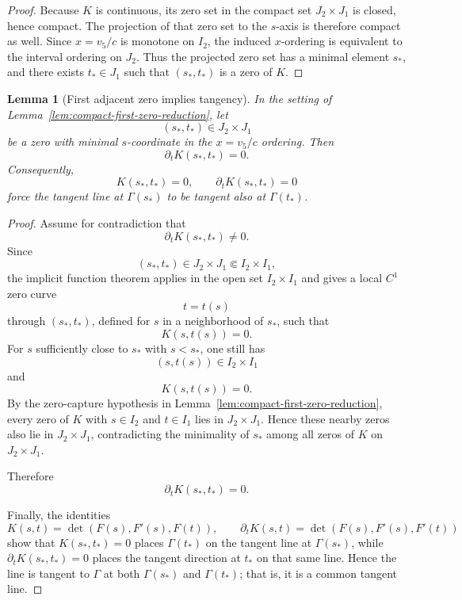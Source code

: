 \documentclass[11pt,a4paper]{amsart}
\theoremstyle{plain}
\newtheorem{lemma}[theorem]{Lemma}
\theoremstyle{definition}
\begin{document}
\begin{proof}
Because $K$ is continuous, its zero set in the compact set $J_2\times J_1$
is closed, hence compact. The projection of that zero set to the $s$-axis is
therefore compact as well. Since $x=v_5/c$ is monotone on $I_2$, the
induced $x$-ordering is equivalent to the interval ordering on $J_2$. Thus
the projected zero set has a minimal element $s_*$, and there exists
$t_*\in J_1$ such that $(s_*,t_*)$ is a zero of $K$.
\end{proof}

\begin{lemma}[First adjacent zero implies tangency]
\label{lem:first-adjacent-zero-implies-tangency}
In the setting of Lemma~\ref{lem:compact-first-zero-reduction}, let
\[
(s_*,t_*)\in J_2\times J_1
\]
be a zero with minimal $s$-coordinate in the $x=v_5/c$ ordering. Then
\[
\partial_t K(s_*,t_*)=0.
\]
Consequently,
\[
K(s_*,t_*)=0,
\qquad
\partial_t K(s_*,t_*)=0
\]
force the tangent line at $\Gamma(s_*)$ to be tangent also at
$\Gamma(t_*)$.
\end{lemma}

\begin{proof}
Assume for contradiction that
\[
\partial_tK(s_*,t_*)\neq 0.
\]
Since
\[
(s_*,t_*)\in J_2\times J_1\Subset I_2\times I_1,
\]
the implicit function theorem applies in the open set $I_2\times I_1$ and
gives a local $C^1$ zero curve
\[
t=t(s)
\]
through $(s_*,t_*)$, defined for $s$ in a neighborhood of $s_*$, such that
\[
K(s,t(s))=0.
\]
For $s$ sufficiently close to $s_*$ with $s<s_*$, one still has
\[
(s,t(s))\in I_2\times I_1
\]
and
\[
K(s,t(s))=0.
\]
By the zero-capture hypothesis in
Lemma~\ref{lem:compact-first-zero-reduction}, every zero of $K$ with
$s\in I_2$ and $t\in I_1$ lies in $J_2\times J_1$. Hence these nearby zeros
also lie in $J_2\times J_1$, contradicting the minimality of $s_*$ among all
zeros of $K$ on $J_2\times J_1$.

Therefore
\[
\partial_tK(s_*,t_*)=0.
\]

Finally, the identities
\[
K(s,t)=\det(F(s),F'(s),F(t)),
\qquad
\partial_tK(s,t)=\det(F(s),F'(s),F'(t))
\]
show that $K(s_*,t_*)=0$ places $\Gamma(t_*)$ on the tangent line at
$\Gamma(s_*)$, while $\partial_tK(s_*,t_*)=0$ places the tangent direction
at $t_*$ on that same line. Hence the line is tangent to $\Gamma$ at both
$\Gamma(s_*)$ and $\Gamma(t_*)$; that is, it is a common tangent line.
\end{proof}
\end{document}
